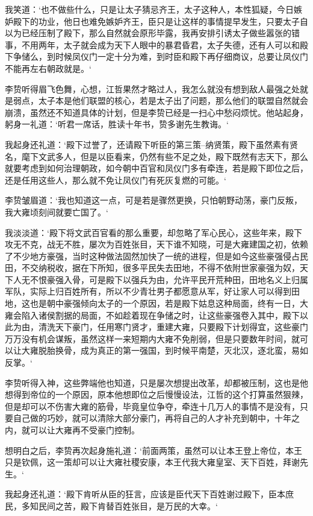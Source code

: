 我笑道：‘也不做些什么，只是让太子猜忌齐王，太子这种人，本性狐疑，今日嫉妒殿下的功业，他日也难免嫉妒齐王，臣只是让这样的事情提早发生，只要太子自以为已经压制了殿下，那么自然就会原形毕露，我再安排引诱太子做些嚣张的错事，不用两年，太子就会成为天下人眼中的暴君昏君，太子失德，还有人可以和殿下争储么，到时候凤仪门一定十分为难，到时臣和殿下再仔细商议，总要让凤仪门不能再左右朝政就是。‘

李贽听得眉飞色舞，心想，江哲果然才略过人，我怎么就没有想到敌人最强之处就是弱点，太子本是他们联盟的核心，若是太子出了问题，那么他们的联盟自然就会崩溃，虽然还不知道具体的计划，但是李贽已经是一扫心中愁闷烦忧。他站起身，躬身一礼道：‘听君一席话，胜读十年书，贽多谢先生教诲。‘

我起身还礼道：‘殿下过誉了，还请殿下听臣的第三策--纳贤策，殿下虽然素有贤名，麾下文武多人，但是以臣看来，仍然有些不足之处，殿下既然有志天下，那么就要考虑到如何治理朝政，如今朝中百官和凤仪门多有牵连，若是殿下即位之后，还是任用这些人，那么就不免让凤仪门有死灰复燃的可能。‘

李贽皱眉道：‘我也知道这一点，可是若是骤然更换，只怕朝野动荡，豪门反叛，我大雍顷刻间就要亡国了。‘

我淡淡道：‘殿下将文武百官看的那么重要，却忽略了军心民心，这些年来，殿下攻无不克，战无不胜，屡次为百姓张目，天下谁不知晓，可是大雍建国之初，依赖了不少地方豪强，当时这种做法固然加快了一统的进程，但是如今这些豪强侵占民田，不交纳税收，据在下所知，很多平民失去田地，不得不依附世家豪强为奴，天下人无不恨豪强入骨，可是殿下以强兵为由，允许平民开荒种田，田地名义上归属军队，实际上归百姓所有，所以不少青壮男子都愿意从军，好让家人可以得到田地，这也是朝中豪强倾向太子的一个原因，若是殿下姑息这种局面，终有一日，大雍会陷入诸侯割据的局面，不如趁着现在争储之时，让这些豪强卷入其中，殿下以此为由，清洗天下豪门，任用寒门贤才，重建大雍，只要殿下计划得宜，这些豪门万万没有机会谋叛，虽然这样一来短期内大雍不免削弱，但是只要数年时间，就可以让大雍脱胎换骨，成为真正的第一强国，到时候平南楚，灭北汉，逐北蛮，易如反掌。‘

李贽听得入神，这些弊端他也知道，只是屡次想提出改革，却都被压制，这也是他想得到帝位的一个原因，原本他想即位之后慢慢设法，江哲的这个打算虽然狠辣，但是却可以不伤害大雍的筋骨，毕竟皇位争夺，牵连十几万人的事情不是没有，只要自己做的巧妙，就可以清除大部分豪门，再将自己的人才补充到朝中，十年之内，就可以让大雍再不受豪门控制。

想明白之后，李贽再次起身施礼道：‘前面两策，虽然可以让本王登上帝位，本王只是钦佩，这一策却可以让大雍社稷安康，本王代我大雍皇室、天下百姓，拜谢先生。‘

我起身还礼道：‘殿下肯听从臣的狂言，应该是臣代天下百姓谢过殿下，臣本庶民，多知民间之苦，殿下肯替百姓张目，是万民的大幸。‘

